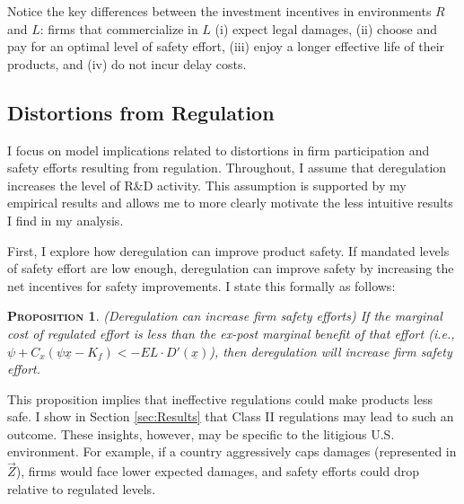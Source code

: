 \documentclass[letterpaper,12pt]{article}
\theoremstyle{definition}
\newtheorem{proposition}{\normalfont\scshape Proposition} %
\begin{document}
Notice the key differences between the investment incentives in environments $R$ and $L$: firms that commercialize in $L$ (i) expect legal damages, (ii) choose and pay for an optimal level of safety effort, (iii) enjoy a longer effective life of their products, and (iv) do not incur delay costs.\footnotemark {} 

\subsection{Distortions from Regulation}

I focus on model implications related to distortions in firm participation and safety efforts resulting from regulation. 
Throughout, I assume that deregulation increases the level of R\&D activity.
This assumption is supported by my empirical results and allows me to more clearly motivate the less intuitive results I find in my analysis. 

First, I explore how deregulation can improve product safety. If mandated levels of safety effort are low enough, deregulation can improve safety by increasing the net incentives for safety improvements. I state this formally as follows:
\begin{proposition}\label{prop:3} \textit{(Deregulation can increase firm safety efforts) If the marginal cost of regulated effort is less than the ex-post marginal benefit of that effort (i.e., $\psi + C_x(\psi\underline{x} - K_f) < -EL \cdot D'(\underline{x})$), then deregulation will increase firm safety effort.}
\end{proposition}


This proposition implies that ineffective regulations could make products less safe. I show in Section \ref{sec:Results} that Class II regulations may lead to such an outcome. These insights, however, may be specific to the litigious U.S. environment. For example, if a country aggressively caps damages (represented in $\vec{Z}$), firms would face lower expected damages, and safety efforts could drop relative to regulated levels.
\end{document}

